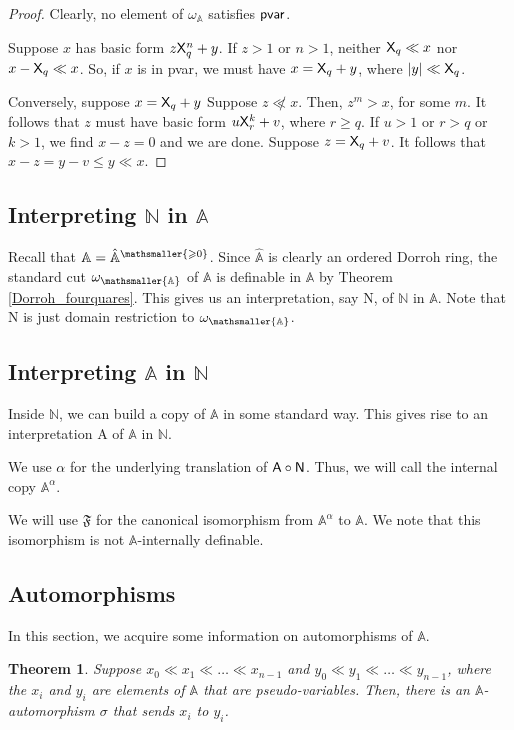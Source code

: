 \documentclass{amsart}
\renewcommand{\leq}{\leqslant}
\renewcommand{\geq}{\geqslant}
\newtheorem{theorem}{Theorem}[section]
\newcommand{\mf}[1]{{\mathfrak {#1}}}
\newcommand{\X}{{\sf X}}
\newcommand{\mbbs}[1]{\ensuremath{\mathsmaller{\mathbb{#1}}}}
\newcommand{\psv}{{\sf pvar}}
\newcommand{\psvar}{pseudo-variables}
\begin{document}
\begin{proof}
Clearly, no element of $\omega_{\mathbb{A}}$ satisfies $\psv$. 

Suppose $x$ has basic form $z\X_q^n+y$.
If $z>1$ or $n>1$, neither $\X_q\ll x$ nor $x-\X_q \ll x$.
So, if $x$ is in
 \psv, we must have $x= \X_q+y$, where $|y|\ll \X_q$.

Conversely, suppose $x = \X_q+y$ 
Suppose $z \not\ll x$. Then, $z^m > x$, for some $m$. It follows that $z$ must have basic form $u\X_r^k+v$,
where $r\geq q$. If $u>1$ or $r>q$ or $k>1$, we find $x-z=0$ and we are done. Suppose $z=\X_q+v$. 
It follows that $x-z = y-v \leq y \ll x$.
\end{proof}

\subsection{Interpreting $\mathbb N$ in $\mathbb A$}
Recall that $\mathbb{A}=\hat{\mathbb{A}}^{\mathsmaller{\geq 0}}$. Since $\hat{\mathbb{A}}$ is clearly an ordered Dorroh ring, the standard cut $\omega_{\mbbs A}$ of $\mathbb A$ is definable in $\mathbb A$ by Theorem \ref{Dorroh_fourquares}. This gives us an interpretation, say {\sf N}, of $\mathbb N$ in $\mathbb A$. Note that {\sf N} is just domain restriction to $\omega_{\mbbs A}$.

\subsection{Interpreting $\mathbb A$ in $\mathbb N$}\label{translation_alpha}
Inside $\mathbb N$, we can build a copy of $\mathbb A$ in some
standard way. This gives rise to an interpretation {\sf A} of $\mathbb A$ in $\mathbb N$.

We use $\alpha$ for the underlying translation of ${\sf A} \circ {\sf N}$.
Thus, we  will call the internal copy $\mathbb A^\alpha$. 

We will use $\mf F$ for the canonical isomorphism from $\mathbb A^\alpha$ to $\mathbb A$. We note that
this isomorphism is not $\mathbb A$-internally definable. 

\subsection{Automorphisms}
In this section, we acquire some information on automorphisms of $\mathbb A$.

\begin{theorem}\label{autosmurf}
Suppose $x_0 \ll x_1 \ll \dots \ll x_{n-1}$ and $y_0 \ll y_1 \ll \dots \ll y_{n-1}$, where the $x_i$ and $y_i$  
are elements of $\mathbb{A}$ that are \psvar. Then, there is an $\mathbb A$-automorphism $\sigma$ that sends $x_i$ to $y_i$.
\end{theorem}
\end{document}
